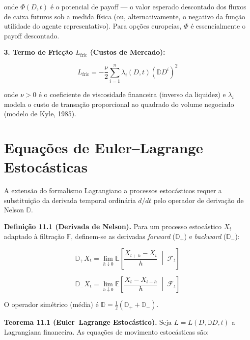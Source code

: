 onde $\Phi(D,t)$ \'e o potencial de payoff --- o valor esperado descontado dos fluxos de caixa futuros sob a medida f\'isica (ou, alternativamente, o negativo da fun\c{c}\~ao utilidade do agente representativo). Para op\c{c}\~oes europeias, $\Phi$ \'e essencialmente o payoff descontado.

\medskip
\noindent\textbf{3. Termo de Fric\c{c}\~ao $L_{\text{fric}}$ (Custos de Mercado):}

\begin{equation}\label{eq:Lfric}
L_{\text{fric}} = -\frac{\nu}{2} \sum_{i=1}^n \lambda_i(D,t) (\mathbb{D}D^i)^2
\end{equation}

onde $\nu > 0$ \'e o coeficiente de viscosidade financeira (inverso da liquidez) e $\lambda_i$ modela o custo de transa\c{c}\~ao proporcional ao quadrado do volume negociado (modelo de Kyle, 1985).

\section{Equa\c{c}\~oes de Euler--Lagrange Estoc\'asticas}

A extens\~ao do formalismo Lagrangiano a processos estoc\'asticos requer a substitui\c{c}\~ao da derivada temporal ordin\'aria $d/dt$ pelo operador de deriva\c{c}\~ao de Nelson $\mathbb{D}$.

\smallskip
\noindent\textbf{Defini\c{c}\~ao 11.1 (Derivada de Nelson).} Para um processo estoc\'astico $X_t$ adaptado \`a filtra\c{c}\~ao $\mathbb{F}$, definem-se as derivadas \textit{forward} ($\mathbb{D}_+$) e \textit{backward} ($\mathbb{D}_-$):

\begin{equation}\label{eq:nelson-forward}
\mathbb{D}_+ X_t = \lim_{h\downarrow 0} \mathbb{E}\left[ \frac{X_{t+h} - X_t}{h} \;\middle|\; \mathcal{F}_t \right]
\end{equation}

\begin{equation}\label{eq:nelson-backward}
\mathbb{D}_- X_t = \lim_{h\downarrow 0} \mathbb{E}\left[ \frac{X_t - X_{t-h}}{h} \;\middle|\; \mathcal{F}_t \right]
\end{equation}

O operador sim\'etrico (m\'edia) \'e $\mathbb{D} = \frac{1}{2}(\mathbb{D}_+ + \mathbb{D}_-)$.

\medskip
\noindent\textbf{Teorema 11.1 (Euler--Lagrange Estoc\'astico).} Seja $L = L(D, \mathbb{D}D, t)$ a Lagrangiana financeira. As equa\c{c}\~oes de movimento estoc\'asticas s\~ao:

